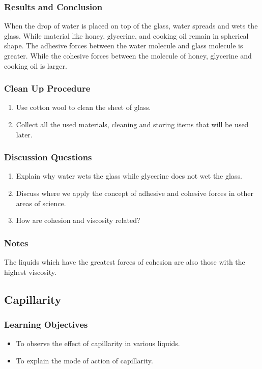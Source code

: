 \subsubsection*{Results and Conclusion}
When the drop of water is placed on top of the glass, water spreads and wets the glass. While material like honey, glycerine, and cooking oil remain in spherical shape. The adhesive forces between the water molecule and glass molecule is greater. While the  cohesive forces between the molecule of honey, glycerine and cooking oil is larger.

\subsubsection*{Clean Up Procedure}
\begin{enumerate}
\item{Use cotton wool to clean the sheet of glass.}
\item{Collect all the used materials, cleaning and storing items that will be used later.}
\end{enumerate}

\subsubsection*{Discussion Questions}
\begin{enumerate}
\item{Explain why water wets the glass while glycerine does not wet the glass.}
\item{Discuss where we apply the concept of adhesive and cohesive forces in other areas of science.}
\item{How are cohesion and viscosity related?}
\end{enumerate}

\subsubsection*{Notes}
The liquids which have the greatest forces of cohesion are also those with the highest viscosity.

\subsection{Capillarity}

\subsubsection*{Learning Objectives}
\begin{itemize}
\item{To observe the effect of capillarity in various liquids.} 
\item{To explain the mode of action of capillarity.} 
\end{itemize}

